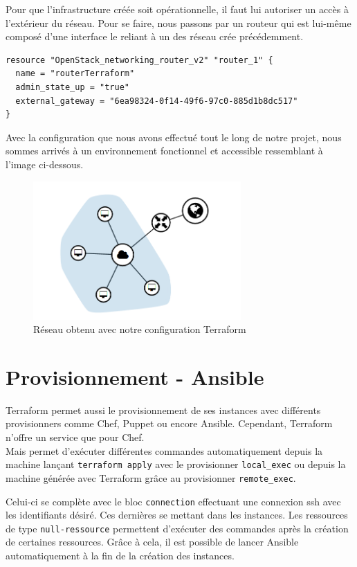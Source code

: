 \documentclass[]{article}
\begin{document}
Pour que l'infrastructure créée soit opérationnelle, il faut lui
autoriser un accès à l'extérieur du réseau. Pour se faire, nous passons
par un routeur qui est lui-même composé d'une interface le reliant à un
des réseau crée précédemment.
\begin{verbatim}
resource "OpenStack_networking_router_v2" "router_1" {
  name = "routerTerraform"
  admin_state_up = "true"
  external_gateway = "6ea98324-0f14-49f6-97c0-885d1b8dc517"
}
\end{verbatim}

\vspace{1cm}
Avec la configuration que nous avons effectué tout le long de notre projet, nous sommes arrivés à un environnement fonctionnel et accessible ressemblant à l'image ci-dessous.
\begin{figure}
\centering
\includegraphics[height=200px]{Images/reseau.png}
\caption{Réseau obtenu avec notre configuration Terraform}
\end{figure}

\newpage
\section{Provisionnement - Ansible}\label{provisionnement}

Terraform permet aussi le provisionnement de ses instances avec
différents provisionners comme Chef, Puppet ou encore Ansible.
Cependant, Terraform n'offre un service que pour Chef.\\
 Mais permet d'exécuter différentes commandes automatiquement depuis la machine
lançant \texttt{terraform\ apply} avec le provisionner
\texttt{local\_exec} ou depuis la machine générée avec Terraform grâce
au provisionner \texttt{remote\_exec}. 

Celui-ci se complète avec le bloc
\texttt{connection} effectuant une connexion ssh avec les identifiants
désiré. Ces dernières se mettant dans les instances. Les ressources de
type \texttt{null-ressource} permettent d'exécuter des commandes après
la création de certaines ressources. Grâce à cela, il est possible de
lancer Ansible automatiquement à la fin de la création des instances.
\end{document}
